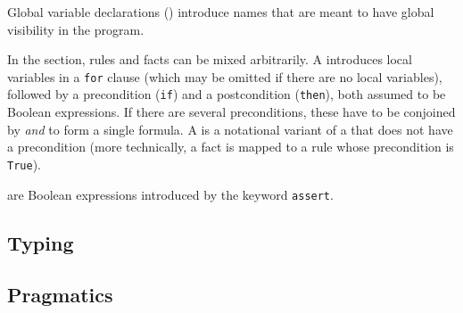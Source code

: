 Global variable declarations () introduce names
that are meant to have global visibility in the program.

In the  section, rules and facts can be mixed
arbitrarily. A  introduces local variables in a
\texttt{for} clause (which may be omitted if there are no local variables),
followed by a precondition (\texttt{if}) and a postcondition (\texttt{then}),
both assumed to be Boolean expressions. If there are several preconditions,
these have to be conjoined by \emph{and} to form a single formula. 
A  is a notational variant of a  
that does not have a precondition (more technically, a fact is mapped to a
rule whose precondition is \texttt{True}).

 are Boolean expressions introduced by the keyword \texttt{assert}.


\subsection{Typing}\label{sec:typing}



\subsection{Pragmatics}\label{sec:pragmatics}



